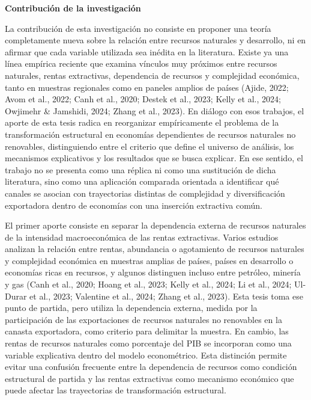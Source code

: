 \documentclass[12pt,a4paper]{article}
\begin{document}
\begin{center}
	{\Large\bfseries Contribución de la investigación}
\end{center}

\vspace{1em}

La contribución de esta investigación no consiste en proponer una teoría completamente nueva sobre la relación entre recursos naturales y desarrollo, ni en afirmar que cada variable utilizada sea inédita en la literatura. Existe ya una línea empírica reciente que examina vínculos muy próximos entre recursos naturales, rentas extractivas, dependencia de recursos y complejidad económica, tanto en muestras regionales como en paneles amplios de países (Ajide, 2022; Avom et al., 2022; Canh et al., 2020; Destek et al., 2023; Kelly et al., 2024; Owjimehr \& Jamshidi, 2024; Zhang et al., 2023). En diálogo con esos trabajos, el aporte de esta tesis radica en reorganizar empíricamente el problema de la transformación estructural en economías dependientes de recursos naturales no renovables, distinguiendo entre el criterio que define el universo de análisis, los mecanismos explicativos y los resultados que se busca explicar. En ese sentido, el trabajo no se presenta como una réplica ni como una sustitución de dicha literatura, sino como una aplicación comparada orientada a identificar qué canales se asocian con trayectorias distintas de complejidad y diversificación exportadora dentro de economías con una inserción extractiva común.

El primer aporte consiste en separar la dependencia externa de recursos naturales de la intensidad macroeconómica de las rentas extractivas. Varios estudios analizan la relación entre rentas, abundancia o agotamiento de recursos naturales y complejidad económica en muestras amplias de países, países en desarrollo o economías ricas en recursos, y algunos distinguen incluso entre petróleo, minería y gas (Canh et al., 2020; Hoang et al., 2023; Kelly et al., 2024; Li et al., 2024; Ul-Durar et al., 2023; Valentine et al., 2024; Zhang et al., 2023). Esta tesis toma ese punto de partida, pero utiliza la dependencia externa, medida por la participación de las exportaciones de recursos naturales no renovables en la canasta exportadora, como criterio para delimitar la muestra. En cambio, las rentas de recursos naturales como porcentaje del PIB se incorporan como una variable explicativa dentro del modelo econométrico. Esta distinción permite evitar una confusión frecuente entre la dependencia de recursos como condición estructural de partida y las rentas extractivas como mecanismo económico que puede afectar las trayectorias de transformación estructural.
\end{document}
